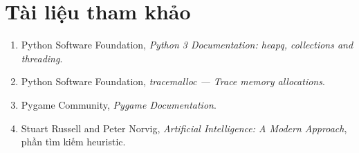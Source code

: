 \documentclass[12pt,a4paper]{article}
\begin{document}
\section{Tài liệu tham khảo}
\begin{enumerate}
  \item Python Software Foundation, \emph{Python 3 Documentation: heapq, collections and threading}.
  \item Python Software Foundation, \emph{tracemalloc --- Trace memory allocations}.
  \item Pygame Community, \emph{Pygame Documentation}.
  \item Stuart Russell and Peter Norvig, \emph{Artificial Intelligence: A Modern Approach}, phần tìm kiếm heuristic.
\end{enumerate}
\end{document}
